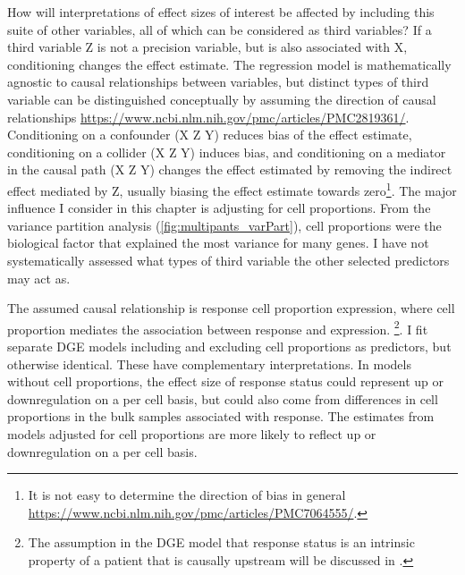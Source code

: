 \begin{outline}
How will interpretations of effect sizes of interest be affected by including this suite of other variables, all of which can be considered as third variables?
If a third variable Z is not a precision variable, but is also associated with X, conditioning changes the effect estimate.
The regression model is mathematically agnostic to causal relationships between variables,
but distinct types of third variable can be distinguished conceptually by assuming the direction of causal relationships \url{https://www.ncbi.nlm.nih.gov/pmc/articles/PMC2819361/}.
Conditioning on a confounder (X \textleftarrow Z \textrightarrow Y) reduces bias of the effect estimate,
conditioning on a collider (X \textrightarrow Z \textleftarrow Y) induces bias,
and conditioning on a mediator in the causal path (X \textrightarrow Z \textrightarrow Y) changes the effect estimated by removing the indirect effect mediated by Z,
usually biasing the effect estimate towards zero\footnote{It is not easy to determine the direction of bias in general \url{https://www.ncbi.nlm.nih.gov/pmc/articles/PMC7064555/}.}.
The major influence I consider in this chapter is adjusting for cell proportions.
From the variance partition analysis (\autoref{fig:multipants_varPart}), cell proportions were the biological factor that explained the most variance for many genes.
I have not systematically assessed what types of third variable the other selected predictors may act as.

The assumed causal relationship is response \textrightarrow cell proportion \textrightarrow expression, where cell proportion mediates the association between response and expression.
\footnote{The assumption in the \gls{DGE} model that response status is an intrinsic property of a patient that is causally upstream will be discussed in \label{chap:discussion}.}.
I fit separate \gls{DGE} models including and excluding cell proportions as predictors, but otherwise identical.
These have complementary interpretations.
In models without cell proportions, the effect size of response status could represent up or downregulation on a per cell basis, 
but could also come from differences in cell proportions in the bulk samples associated with response.
The estimates from models adjusted for cell proportions are more likely to reflect up or downregulation on a per cell basis.


\end{outline}
